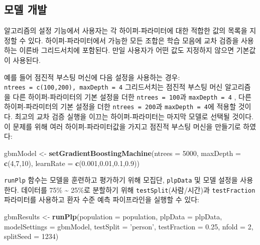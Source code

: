 \documentclass[10.5pt]{book}
\newenvironment{Shaded}{\begin{snugshade}}{\end{snugshade}}
\newcommand{\KeywordTok}[1]{\textcolor[rgb]{0.13,0.29,0.53}{\textbf{#1}}}
\newcommand{\DataTypeTok}[1]{\textcolor[rgb]{0.13,0.29,0.53}{#1}}
\newcommand{\DecValTok}[1]{\textcolor[rgb]{0.00,0.00,0.81}{#1}}
\newcommand{\FloatTok}[1]{\textcolor[rgb]{0.00,0.00,0.81}{#1}}
\newcommand{\StringTok}[1]{\textcolor[rgb]{0.31,0.60,0.02}{#1}}
\newcommand{\NormalTok}[1]{#1}
\theoremstyle{definition}
\theoremstyle{definition}
\theoremstyle{definition}
\theoremstyle{remark}
\begin{document}
\subsection{모델 개발}\label{-}

알고리즘의 설정 기능에서 사용자는 각 하이퍼-파라미터에 대한 적합한 값의
목록을 지정할 수 있다. 하이퍼-파라미터에서 가능한 모든 조합은 학습
모음에 교차 검증을 사용하는 이른바 그리드서치에 포함된다. 만일 사용자가
어떤 값도 지정하지 않으면 기본값이 사용된다.

예를 들어 점진적 부스팅 머신에 다음 설정을 사용하는 경우:
\texttt{ntrees\ =\ c(100,200),\ maxDepth\ =\ 4} 그리드서치는 점진적
부스팅 머신 알고리즘을 다른 하이퍼-파라미터의 기본 설정을 더한
\texttt{ntrees\ =\ 100}과 \texttt{maxDepth\ =\ 4} , 다른
하이퍼-파라미터의 기본 설정을 더한 \texttt{ntrees\ =\ 200}과
\texttt{maxDepth\ =\ 4}에 적용할 것이다. 최고의 교차 검증 실행을 이끄는
하이퍼-파라미터는 마지막 모델로 선택될 것이다. 이 문제를 위해 여러
하이퍼-파라미터값을 가지고 점진적 부스팅 머신을 만들기로 하였다:

\begin{Shaded}
\begin{Highlighting}[]
\NormalTok{gbmModel <-}\StringTok{ }\KeywordTok{setGradientBoostingMachine}\NormalTok{(}\DataTypeTok{ntrees =} \DecValTok{5000}\NormalTok{, }
                                       \DataTypeTok{maxDepth =} \KeywordTok{c}\NormalTok{(}\DecValTok{4}\NormalTok{,}\DecValTok{7}\NormalTok{,}\DecValTok{10}\NormalTok{), }
                                       \DataTypeTok{learnRate =} \KeywordTok{c}\NormalTok{(}\FloatTok{0.001}\NormalTok{,}\FloatTok{0.01}\NormalTok{,}\FloatTok{0.1}\NormalTok{,}\FloatTok{0.9}\NormalTok{))}
\end{Highlighting}
\end{Shaded}

\texttt{runPlp} 함수는 모델을 훈련하고 평가하기 위해 모집단,
\texttt{plpData} 및 모델 설정을 사용한다. 데이터를 75\%
\textasciitilde{} 25\%로 분할하기 위해 \texttt{testSplit}(사람/시간)과
\texttt{testFraction} 파라미터를 사용하고 환자 수준 예측 파이프라인을
실행할 수 있다:

\begin{Shaded}
\begin{Highlighting}[]
\NormalTok{gbmResults <-}\StringTok{ }\KeywordTok{runPlp}\NormalTok{(}\DataTypeTok{population =}\NormalTok{ population, }
                     \DataTypeTok{plpData =}\NormalTok{ plpData, }
                     \DataTypeTok{modelSettings =}\NormalTok{ gbmModel, }
                     \DataTypeTok{testSplit =} \StringTok{'person'}\NormalTok{,}
                     \DataTypeTok{testFraction =} \FloatTok{0.25}\NormalTok{, }
                     \DataTypeTok{nfold =} \DecValTok{2}\NormalTok{, }
                     \DataTypeTok{splitSeed =} \DecValTok{1234}\NormalTok{)}
\end{Highlighting}
\end{Shaded}
\end{document}
